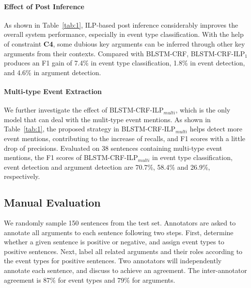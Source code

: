 \paragraph{Effect of Post Inference} 
As shown in Table~\ref{tab:1}, ILP-based post inference considerably improves the overall system performance, especially in event type classification. With the help of constraint \textbf{C4},  some dubious key arguments can be inferred through other key arguments from their contexts. Compared with BLSTM-CRF, BLSTM-CRF-ILP$_1$ produces an F1 gain of 7.4\% in event type classification, 1.8\% in event detection, and 4.6\% in argument detection. %

\paragraph{Multi-type Event Extraction}
We further investigate the effect of BLSTM-CRF-ILP$_{multi}$, which is the only model that can deal with the mulit-type event mentions. As shown in Table~\ref{tab:1}, the proposed strategy in BLSTM-CRF-ILP$_{multi}$ helps detect more event mentions, contributing to the increase of recalls, and F1 scores with a little drop of precisions. Evaluated on 38 sentences containing multi-type event mentions, the F1 scores of BLSTM-CRF-ILP$_{multi}$ in event type classification, event detection and argument detection are 70.7\%, 58.4\% and 26.9\%, respectively. 

\subsection{Manual Evaluation \label{manualeve}}
We randomly sample 150 sentences from the test set. Annotators are asked to annotate all arguments to each sentence following two steps. First, determine whether a given sentence is positive or negative, and assign event types to positive sentences. Next, label all related arguments and their roles according to the event types for positive sentences. Two annotators will independently annotate each sentence, and discuss to achieve an agreement. The inter-annotator agreement is 87\% for event types and 79\% for arguments.

